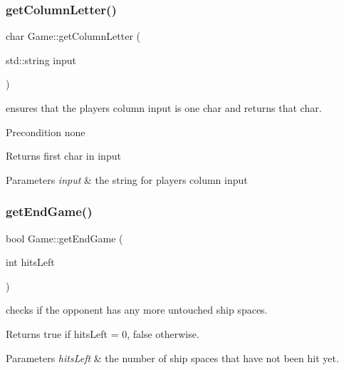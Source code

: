 \subsubsection{\texorpdfstring{get\+Column\+Letter()}{getColumnLetter()}}
{\footnotesize\ttfamily char Game\+::get\+Column\+Letter (\begin{DoxyParamCaption}\item[{std\+::string}]{input }\end{DoxyParamCaption})}



ensures that the player\textquotesingle{}s column input is one char and returns that char. 

\begin{DoxyPrecond}{Precondition}
none 
\end{DoxyPrecond}
\begin{DoxyReturn}{Returns}
first char in input 
\end{DoxyReturn}

\begin{DoxyParams}{Parameters}
{\em input} & the string for player\textquotesingle{}s column input \\
\hline
\end{DoxyParams}
\mbox{\label{classGame_ad71f679248bf79e4edd5b93d5985b098}} 
\subsubsection{\texorpdfstring{get\+End\+Game()}{getEndGame()}}
{\footnotesize\ttfamily bool Game\+::get\+End\+Game (\begin{DoxyParamCaption}\item[{int}]{hits\+Left }\end{DoxyParamCaption})}



checks if the opponent has any more untouched ship spaces. 

\begin{DoxyReturn}{Returns}
true if hits\+Left = 0, false otherwise. 
\end{DoxyReturn}

\begin{DoxyParams}{Parameters}
{\em hits\+Left} & the number of ship spaces that have not been hit yet. \\
\hline
\end{DoxyParams}
\mbox{\label{classGame_a964a5b6a1a7f69d7ad461b9ca7ff18fc}} 
